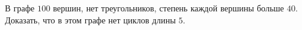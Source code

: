 В графе $100$ вершин, нет треугольников, степень каждой вершины больше $40$. Доказать, что в этом графе нет циклов длины $5$.